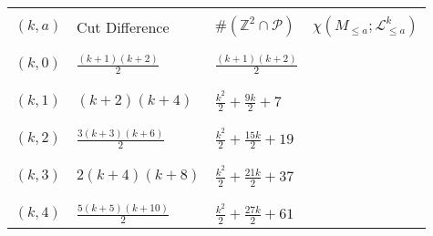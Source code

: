 \documentclass[11pt]{article}
\begin{document}
\begin{table}[]
	\begin{tabular}{|l|l|l|l|}
		\hline
			     &                &                      &                \\
		$(k,a)$  & Cut Difference & $\#(\mathbb{Z}^{2} \cap \mathcal{P})$ & $\chi(M_{\leq a}; \mathcal{L}_{\leq a}^{k})$ \\
			     &                &                      &                \\ \hline
			     &                &                      &                \\	     
		$(k,0)$  & $\displaystyle \frac{\left(k + 1\right) \left(k + 2\right)}{2}$               & $\displaystyle \frac{\left(k + 1\right) \left(k + 2\right)}{2}$                     &                \\
			     &                &                      &                \\ \hline
			     &                &                      &                \\	     
		$(k,1)$  & $\displaystyle \left(k + 2\right) \left(k + 4\right)$               & $\displaystyle \frac{k^{2}}{2} + \frac{9 k}{2} + 7$                     &                \\
			     &                &                      &                \\ \hline
			     &                &                      &                \\	     
	    $(k,2)$  & $\displaystyle \frac{3 \left(k + 3\right) \left(k + 6\right)}{2}$               & $\displaystyle \frac{k^{2}}{2} + \frac{15 k}{2} + 19$                     &                \\
			     &                &                      &                \\ \hline
			     &                &                      &                \\	     
	    $(k,3)$  & $\displaystyle 2 \left(k + 4\right) \left(k + 8\right)$               & $\displaystyle \frac{k^{2}}{2} + \frac{21 k}{2} + 37$                     &                \\
			     &                &                      &                \\ \hline
			     &                &                      &                \\	     
		$(k,4)$  & $\displaystyle \frac{5 \left(k + 5\right) \left(k + 10\right)}{2}$               & $\displaystyle \frac{k^{2}}{2} + \frac{27 k}{2} + 61$                     &                \\

\end{tabular}
\end{table}
\end{document}
